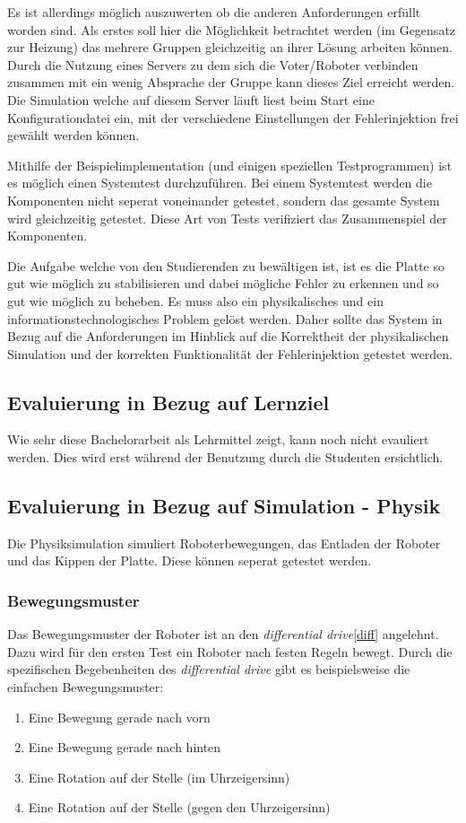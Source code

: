 {Es ist allerdings m{\"{o}}glich auszuwerten ob die anderen Anforderungen erf{\"{u}}llt worden sind. Als erstes
soll hier die M{\"{o}}glichkeit betrachtet werden (im Gegensatz zur Heizung) das mehrere Gruppen gleichzeitig
an ihrer L{\"{o}}sung arbeiten k{\"{o}}nnen. Durch die Nutzung eines Servers zu dem sich die Voter/Roboter
verbinden zusammen mit ein wenig Absprache der Gruppe kann dieses Ziel erreicht werden. Die Simulation welche
auf diesem Server l{\"{a}}uft liest beim Start eine Konfigurationdatei ein, mit der verschiedene Einstellungen
der Fehlerinjektion frei gew{\"{a}}hlt werden k{\"{o}}nnen.


Mithilfe der Beispielimplementation (und einigen speziellen Testprogrammen) ist es m{\"{o}}glich einen Systemtest
durchzuf{\"{u}}hren. Bei einem Systemtest werden die Komponenten nicht seperat voneinander getestet, sondern das
gesamte System wird gleichzeitig getestet. Diese Art von Tests verifiziert das Zusammenspiel der Komponenten.

Die Aufgabe welche von den Studierenden zu bew{\"{a}}ltigen ist, ist es die Platte so gut wie m{\"{o}}glich zu
stabilisieren und dabei m{\"{o}}gliche Fehler zu erkennen und so gut wie m{\"{o}}glich zu beheben. Es muss also
ein physikalisches und ein informationstechnologisches Problem gel{\"{o}}st werden. Daher sollte das System in
Bezug auf die Anforderungen im Hinblick auf die Korrektheit der physikalischen Simulation und der korrekten
Funktionalit{\"{a}}t der Fehlerinjektion getestet werden.

\subsection{Evaluierung in Bezug auf Lernziel}
Wie sehr diese Bachelorarbeit als Lehrmittel zeigt, kann noch nicht evauliert werden. Dies wird erst w{\"{a}}hrend
der Benutzung durch die Studenten ersichtlich.

\subsection{Evaluierung in Bezug auf Simulation - Physik}
Die Physiksimulation simuliert Roboterbewegungen, das Entladen der Roboter und das Kippen der Platte. Diese k{\"{o}}nnen
seperat getestet werden.

\subsubsection{Bewegungsmuster}
Das Bewegungsmuster der Roboter ist an den \textit{differential drive}\ref{diff} angelehnt. Dazu wird f{\"{u}}r den ersten Test ein
Roboter nach festen Regeln bewegt. Durch die spezifischen Begebenheiten des \textit{differential drive} gibt es beispielsweise die einfachen
Bewegungsmuster:
\begin{enumerate}
	\item Eine Bewegung gerade nach vorn
	\item Eine Bewegung gerade nach hinten
	\item Eine Rotation auf der Stelle (im Uhrzeigersinn)
	\item Eine Rotation auf der Stelle (gegen den Uhrzeigersinn)
\end{enumerate}

}
